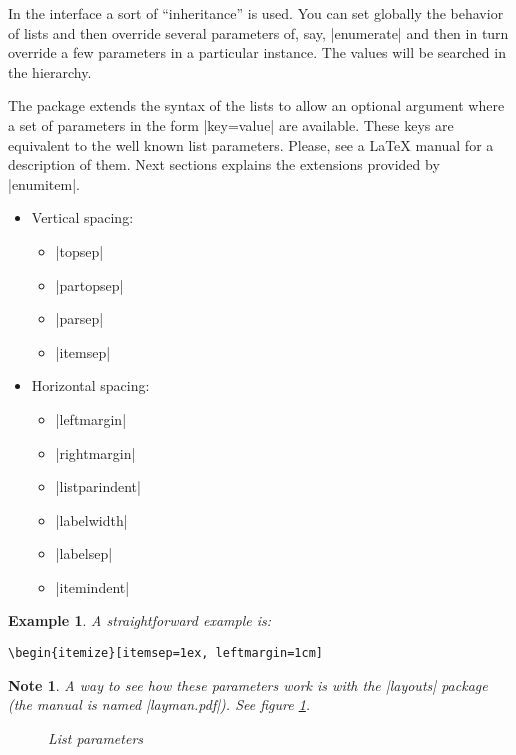 \documentclass[a4paper]{ltxguide}
\newtheorem{note}{Note}
\newtheorem{example}{Example}
\begin{document}
In the interface a sort of ``inheritance'' is used. You can set
globally the behavior of lists and then override several parameters of,
say, |enumerate| and then in turn override a few parameters in a
particular instance. The values will be searched in the hierarchy.

The package extends the syntax of the lists to allow an optional
argument where a set of parameters in the form |key=value| are
available. These keys are equivalent to the well known list parameters.
Please, see a \LaTeX{} manual for a description of them. Next sections
explains the extensions provided by |enumitem|.
\begin{itemize}
\item
Vertical spacing:
\begin{itemize}
\setlength{\itemsep}{0pt}
\item |topsep|
\item |partopsep|
\item |parsep|
\item |itemsep|
\end{itemize}
\item
Horizontal spacing:
\begin{itemize}
\setlength{\itemsep}{0pt}
\item |leftmargin|
\item |rightmargin|
\item |listparindent|
\item |labelwidth|
\item |labelsep|
\item |itemindent|
\end{itemize}
\end{itemize}

\begin{example}
  A straightforward example is:
\begin{verbatim}
\begin{itemize}[itemsep=1ex, leftmargin=1cm]
\end{verbatim}
\end{example}

\begin{note}
  A way to see how these parameters work is with the |layouts| package
  (the manual is named |layman.pdf|).
  \ifx\listdiagram\notundefined\else
    See figure \ref{f.drawlist}.
    \begin{figure}
      \centering
      \listdiagram
      \caption{List parameters}\label{f.drawlist}
    \end{figure}
  \fi
\end{note}
\end{document}
